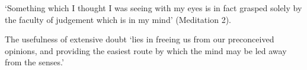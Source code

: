 \documentclass[12pt]{extarticle}
\begin{document}
\begin{multicols*}{3}
‘Something which I thought I was seeing with my eyes is in fact grasped solely by the faculty of
judgement which is in my mind’
(Meditation 2).
 
The usefulness of extensive doubt ‘lies in freeing us from our preconceived opinions,  and providing the easiest route by which the mind may be  led away from the senses.’
 

    







\footnotesize


\end{multicols*}
\end{document}
